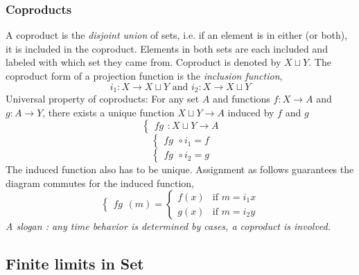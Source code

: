 \documentclass{article}
\begin{document}
\subsubsection{Coproducts}
A coproduct is the \emph{disjoint union} of sets, i.e. if an element is in either (or both), it is included in the coproduct. Elements in both sets are each included and labeled with which set they came from.
Coproduct is denoted by $X \sqcup Y$. The coproduct form of a projection function is the \emph{inclusion function},
\begin{equation*}
i_1 : X \rightarrow X \sqcup Y \text{ and } i_2 : X \rightarrow X \sqcup Y
\end{equation*}
Universal property of coproducts: 
For any set $A$ and functions $f: X \rightarrow A$ and $g: A \rightarrow Y$, there exists a unique function $X \sqcup Y \rightarrow A$ induced by $f$ and $g$
\begin{equation*}
\begin{cases}fg\end{cases}: X \sqcup Y \rightarrow A 
\end{equation*}
\begin{equation*}
\begin{cases}fg\end{cases} \circ i_1 = f 
\end{equation*}
\begin{equation*}
\begin{cases}fg\end{cases} \circ i_2 = g
\end{equation*}
The induced function also has to be unique. Assignment as follows guarantees the diagram commutes for the induced function,
\begin{equation*}
\begin{cases}fg\end{cases}(m) = 
\begin{cases}
f(x)& \text{if $m = i_1 x$} \\
g(x)& \text{if $m = i_2 y$}
\end{cases}
\end{equation*}
\emph{A slogan : any time behavior is determined by cases, a coproduct is involved.}

\subsection{Finite limits in Set}
\end{document}
